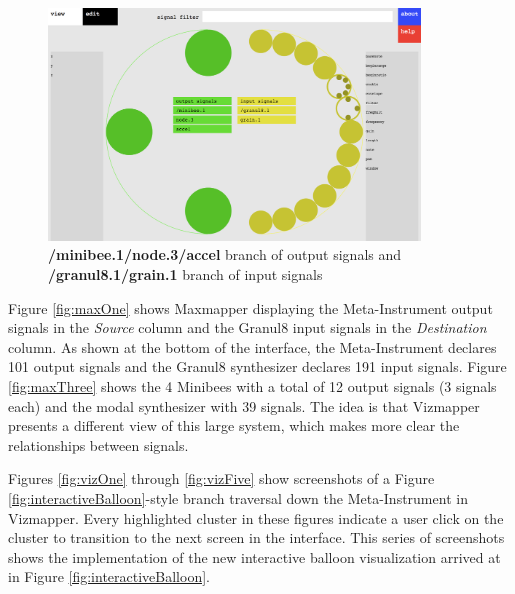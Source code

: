 \begin{figure}[p]
\centering
\includegraphics[width=0.88\textwidth]{vizmapperSix.png}
\caption{\textbf{/minibee.1/node.3/accel} branch of output signals and \textbf{/granul8.1/grain.1} branch of input signals}
\label{fig:vizSix}
\end{figure}

Figure \ref{fig:maxOne} shows Maxmapper displaying the Meta-Instrument output signals in the \emph{Source} column and the Granul8 input signals in the \emph{Destination} column. As shown at the bottom of the interface, the Meta-Instrument declares 101 output signals and the Granul8 synthesizer declares 191 input signals. Figure \ref{fig:maxThree} shows the 4 Minibees with a total of 12 output signals (3 signals each) and the modal synthesizer with 39 signals. The idea is that Vizmapper presents a different view of this large system, which makes more clear the relationships between signals.

Figures \ref{fig:vizOne} through \ref{fig:vizFive} show screenshots of a Figure \ref{fig:interactiveBalloon}-style branch traversal down the Meta-Instrument in Vizmapper. Every highlighted cluster in these figures indicate a user click on the cluster to transition to the next screen in the interface. This series of screenshots shows the implementation of the new interactive balloon visualization arrived at in Figure \ref{fig:interactiveBalloon}. 

